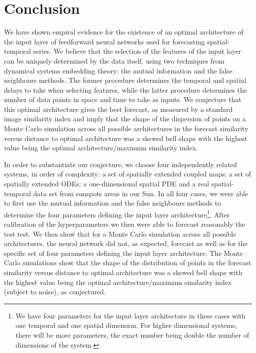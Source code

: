 \documentclass[journal]{IEEEtran}
\begin{document}




\section{Conclusion}
We have shown empiral evidence for the existence of an optimal architecture of the input layer of feedforward neural networks used for 
forecasting spatial-temporal series. We believe that the selection of the features  of the input layer can be uniquely determined by 
the data itself, using two techniques from dynamical systems  embedding theory: the mutual information and the false neighbours 
methods. The former procedure determines the temporal and spatial delays to take when selecting features, while the latter procedure 
determines the number of data points in space and time to take as inputs.  We conjecture that this optimal architecture gives the best 
forecast, as measured by a standard image similarity index and  imply that the shape of the dispersion of points on a Monte Carlo 
simulation across all possible architectures in the forecast similarity versus distance to optimal architecture was a skewed bell  
shape with the highest value being the optimal architecture/maximum similarity index.
  
In order to substantiate our conjecture, we choose four independently related systems, in order of complexity: a set of spatially 
extended coupled maps; a set of spatially extended ODEs; a one-dimensional spatial PDE and a real spatial-temporal data set from 
sunspots areas in our Sun. In all four cases, we were able to first use the mutual information and  the false neighbours methods to 
determine the four parameters defining the input layer architecture\footnote{We have four parameters for the input layer architecture 
in these cases with one temporal and one spatial dimension. For higher dimensional systems, there will be more parameters, the exact 
number being double the number of dimensions of the system.}. After calibration of the hyperparameters we then were able to forecast 
reasonably the test test. We then show that for a Monte Carlo simulation across all possible architectures, the neural network did not, 
as expected, forecast as well as for the specific set of four parameters defining the input layer architecture. The Monte Carlo 
simulations show that the shape of the distribution of points in the forecast similarity versus distance to optimal architecture was a 
skewed bell  shape with the highest value being the optimal architecture/maximum similarity index (subject to noise), as conjectured.
\end{document}
